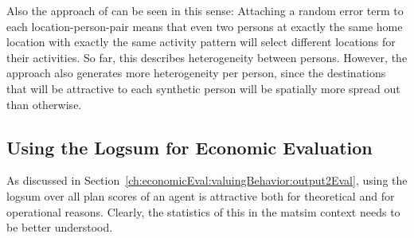 Also the approach of \citet[][also see Chapter~\ref{ch:destinationchoice} of this book]{Horni_PhDThesis_2013} can be seen in this sense: Attaching a random error term to each location-person-pair means that even two persons at exactly the same home location with exactly the same activity pattern will select different locations for their activities.  So far, this describes heterogeneity between persons.  However, the approach also generates more heterogeneity per person, since the destinations that will be attractive to each synthetic person will be spatially more spread out than otherwise.

\subsection{Using the Logsum for Economic Evaluation}
\label{sec:using-logsum-4-eval}

As discussed in Section~\ref{ch:economicEval:valuingBehavior:output2Eval}, using the \gls{logsum} over all plan scores of an agent is attractive both for theoretical and for operational reasons.  Clearly, the statistics of this in the \gls{matsim} context needs to be better understood.

